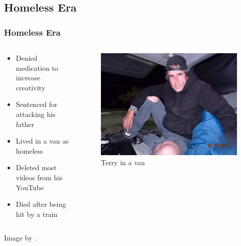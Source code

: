 \documentclass{beamer}
\begin{document}
	\subsection{Homeless Era}
	\begin{frame}
		\frametitle{Homeless Era}
		\begin{columns}
			\begin{column}{0.7\textwidth}
				\begin{itemize}
					\item Denied medication to increase creativity

					\item Sentenced for attacking his father

					\item Lived in a van as homeless

					\item Deleted most videos from his YouTube

					\item Died after being hit by a train
				\end{itemize}
			\end{column}
			\begin{column}{0.3\textwidth}
				\begin{figure}
					\centering
					\includegraphics[width=\linewidth]{images/terry_2.jpg}
					\caption{Terry in a van}
					\label{fig:terry-van}
				\end{figure}
			\end{column}
		\end{columns}
		Image by \cite{davis_terry_2017}.
	\end{frame}
\end{document}
